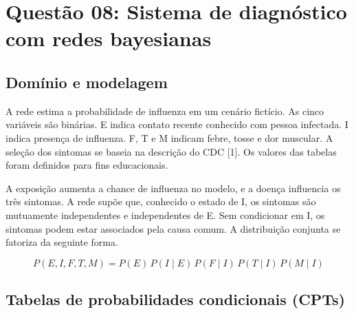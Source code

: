 \documentclass[12pt,a4paper]{article}
\begin{document}
\section{Questão 08: Sistema de diagnóstico com redes bayesianas}

\subsection{Domínio e modelagem}

A rede estima a probabilidade de influenza em um cenário fictício. As cinco variáveis são binárias. E indica contato recente conhecido com pessoa infectada. I indica presença de influenza. F, T e M indicam febre, tosse e dor muscular. A seleção dos sintomas se baseia na descrição do CDC [1]. Os valores das tabelas foram definidos para fins educacionais.

\begin{figure}[htbp]
    \centering
\end{figure}

A exposição aumenta a chance de influenza no modelo, e a doença influencia os três sintomas. A rede supõe que, conhecido o estado de I, os sintomas são mutuamente independentes e independentes de E. Sem condicionar em I, os sintomas podem estar associados pela causa comum. A distribuição conjunta se fatoriza da seguinte forma.

\[
P(E, I, F, T, M) = P(E)\,P(I \mid E)\,P(F \mid I)\,P(T \mid I)\,P(M \mid I)
\]

\subsection{Tabelas de probabilidades condicionais (CPTs)}
\end{document}
